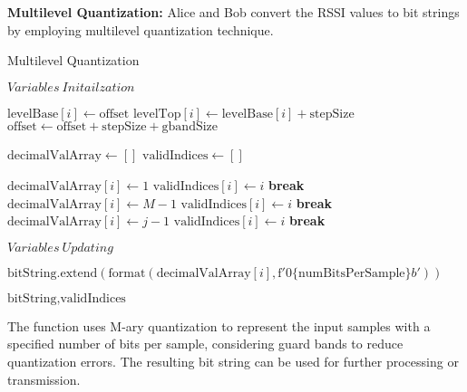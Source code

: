 \textbf{Multilevel Quantization:} Alice and Bob convert the RSSI values to bit strings by employing multilevel quantization technique.
\begin{algorithm}[hbt!]
  \caption{Multilevel Quantization}\label{alg:Quantization}
  \begin{algorithmic}
      \State $Variables\ Initailzation$
  
          \State $\text{levelBase}[i] \gets \text{offset}$
          \State $\text{levelTop}[i] \gets \text{levelBase}[i] + \text{stepSize}$
          \State $\text{offset} \gets \text{offset} + \text{stepSize} + \text{gbandSize}$
      \EndFor
  
      \State $\text{decimalValArray} \gets []$
      \State $\text{validIndices} \gets []$
  
                  \State $\text{decimalValArray}[i] \gets 1$ 
                  \State $\text{validIndices}[i] \gets i$
                  \State \textbf{break}
                  \State $\text{decimalValArray}[i] \gets M - 1$ 
                  \State $\text{validIndices}[i] \gets i$
                  \State \textbf{break}
                  \State $\text{decimalValArray}[i] \gets j - 1$ 
                  \State $\text{validIndices}[i] \gets i$
                  \State \textbf{break}
              \EndIf
          \EndFor
      \EndFor
  
      \State $Variables\ Updating$
  
          \State $\text{bitString}.\text{extend}(\text{format}(\text{decimalValArray}[i], \text{f}'0\{\text{numBitsPerSample}\}b'))$
      \EndFor
  
      \State \Return $\text{bitString}, \text{validIndices}$
  \EndFunction
  \end{algorithmic}
\end{algorithm}

The function uses M-ary quantization to represent the input samples with a specified number of bits per sample, considering guard bands to reduce quantization errors. The resulting bit string can be used for further processing or transmission.


